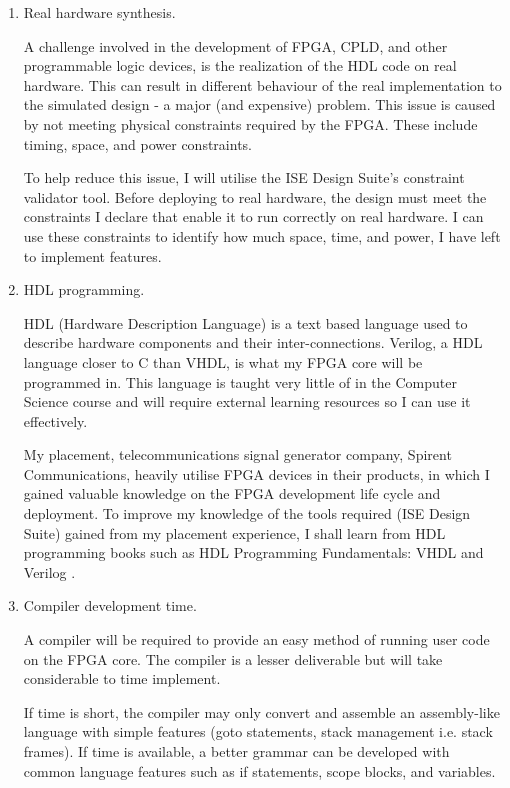 \documentclass[11pt,a4paper]{article}
\begin{document}
\begin{enumerate}
\item{
Real hardware synthesis. 

A challenge involved in the development of FPGA, CPLD, and other programmable logic devices, is the realization of the HDL code on real hardware. This can result in different behaviour of the real implementation to the simulated design - a major (and expensive) problem. This issue is caused by not meeting physical constraints required by the FPGA. These include timing, space, and power constraints.

To help reduce this issue, I will utilise the ISE Design Suite's constraint validator tool. Before deploying to real hardware, the design must meet the constraints I declare that enable it to run correctly on real hardware. I can use these constraints to identify how much space, time, and power, I have left to implement features.
}\label{risk:hw}
\item{
HDL programming. 

HDL (Hardware Description Language) is a text based language used to describe hardware components and their inter-connections. Verilog, a HDL language closer to C than VHDL, is what my FPGA core will be programmed in. This language is taught very little of in the Computer Science course and will require external learning resources so I can use it effectively. 

My placement,  telecommunications signal generator company, Spirent Communications, heavily utilise FPGA devices in their products, in which I gained valuable knowledge on the FPGA development life cycle and deployment. To improve my knowledge of the tools required (ISE Design Suite) gained from my placement experience, I shall learn from HDL programming books such as HDL Programming Fundamentals: VHDL and Verilog \citep{hdl}.
}

\item{Compiler development time. 

A compiler will be required to provide an easy method of running user code on the FPGA core. The compiler is a lesser deliverable but will take considerable to time implement.

If time is short, the compiler may only convert and assemble an assembly-like language with simple features (goto statements, stack management i.e. stack frames). If time is available, a better grammar can be developed with common language features such as if statements, scope blocks, and variables.

}
\end{enumerate}
\end{document}
